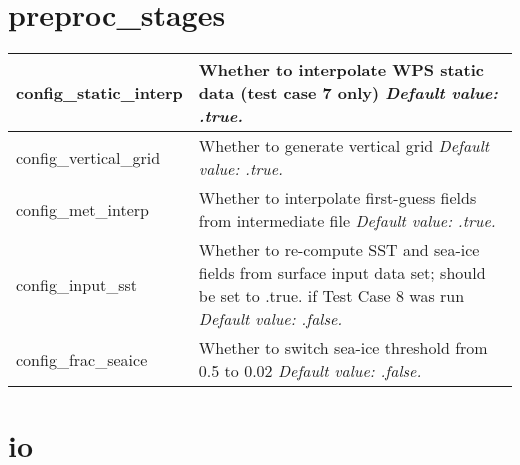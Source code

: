 \section{preproc\_stages}

{\small
\begin{longtable}{|p{1.5in} |p{4.75in}|}
 \hline 
   config\_static\_interp   & Whether to interpolate WPS static data (test case 7 only) \newline 
   {\em Default value: .true.} \\ \hline

   config\_vertical\_grid   & Whether to generate vertical grid \newline 
   {\em Default value: .true.} \\ \hline

   config\_met\_interp      & Whether to interpolate first-guess fields from intermediate file \newline 
   {\em Default value: .true.} \\ \hline
  
 
   config\_input\_sst       & Whether to re-compute SST and sea-ice fields from surface input data set; should be set to .true. if Test Case 8 was run \newline 
   {\em Default value: .false.} \\ \hline
    
   config\_frac\_seaice       & Whether to switch sea-ice threshold from 0.5 to 0.02 \newline 
   {\em Default value: .false.} \\ \hline
\end{longtable}
}

\section{io}

